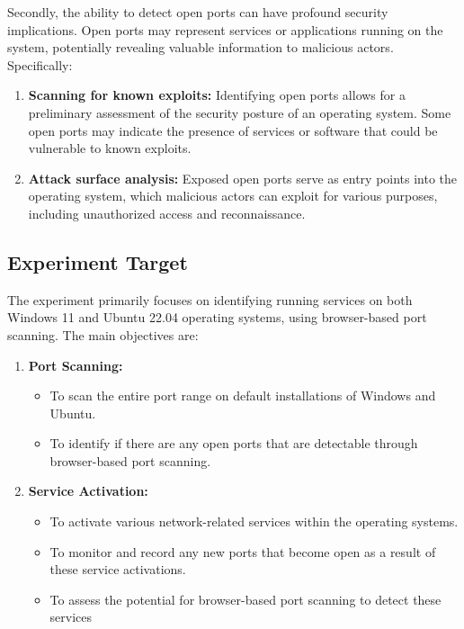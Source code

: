 Secondly, the ability to detect open ports can have profound security implications. Open ports may represent services or applications running on the system, potentially revealing valuable information to malicious actors. Specifically:

\begin{enumerate}
  \item \textbf{Scanning for known exploits:} Identifying open ports allows for a preliminary assessment of the security posture of an operating system. Some open ports may indicate the presence of services or software that could be vulnerable to known exploits. 
  
  \item \textbf{Attack surface analysis:} Exposed open ports serve as entry points into the operating system, which malicious actors can exploit for various purposes, including unauthorized access and reconnaissance.
\end{enumerate}

\subsection{Experiment Target}
The experiment primarily focuses on identifying running services on both Windows 11 and Ubuntu 22.04 operating systems, using browser-based port scanning. The main objectives are:

\begin{enumerate}
    \item \textbf{Port Scanning:}
    \begin{itemize}
        \item To scan the entire port range on default installations of Windows and Ubuntu.
        \item To identify if there are any open ports that are detectable through browser-based port scanning.
    \end{itemize}

    \item \textbf{Service Activation:}
    \begin{itemize}
        \item To activate various network-related services within the operating systems.
        \item To monitor and record any new ports that become open as a result of these service activations.
        \item To assess the potential for browser-based port scanning to detect these services
    \end{itemize}
\end{enumerate}

